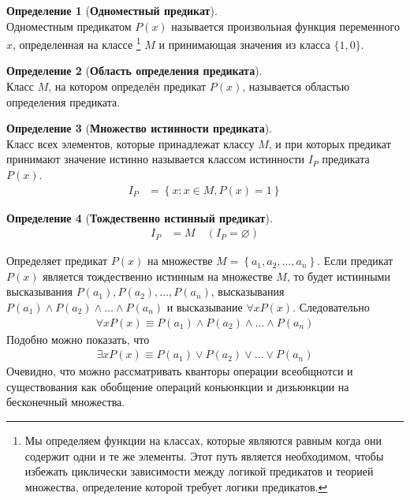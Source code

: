 \documentclass[fleqn,11pt]{article}
\theoremstyle{definition}
\newtheorem{definition}{Определение}
\begin{document}
\begin{definition}[\textbf{Одноместный предикат}] ~\\
	Одноместным предикатом $P(x)$ называется произвольная функция переменного $x$, определенная на классе
	\footnote{Мы определяем функции на классах, которые являются равным когда они содержит одни и те же элементы.
	Этот путь является необходимом, чтобы избежать циклически зависимости между логикой предикатов и теорией множества,
	определение которой требует логики предикатов.
	} $M$ и принимающая
	значения из класса $\{1,0\}$.
\end{definition}

\begin{definition}[\textbf{Область определения предиката}] ~\\
Класс $M$, на котором определён предикат $P(x)$, называется областью определения предиката.
\end{definition}

\begin{definition}[\textbf{Множество истинности предиката}] ~\\
	Класс всех элементов, которые принадлежат классу $M$, и при которых предикат принимают значение истинно называется
	классом истинности $I_P$ предиката $P(x)$.
	\begin{align}
		I_P &= \left\{x : x \in M, P(x) = 1 \right\}
	\end{align}
\end{definition}

\begin{definition}[\textbf{Тождественно истинный предикат}] ~\\
	\begin{align}
		I_P &= M \quad (I_P = \varnothing)
	\end{align}
\end{definition}

Определяет предикат $P(x)$ на множестве $M = \left\{a_1, a_2, \dots , a_n \right\}$. Если предикат $P(x)$
является тождественно истинным на множестве $M$, то будет истинными высказывания
$P(a_1), P(a_2), \dots, P(a_n)$,
высказывания $P(a_1) \land P(a_2) \land \dots \land P(a_n)$ и высказывание $\forall x P(x)$. Следовательно
\begin{align}
	\forall x P(x) \equiv P(a_1) \land P(a_2) \land \dots \land P(a_n)
\end{align}
Подобно можно показать, что
\begin{align}
	\exists x P(x) \equiv P(a_1) \lor P(a_2) \lor \dots \lor P(a_n)
\end{align}
Очевидно, что можно рассматривать кванторы операции всеобщнотси и существования как
обобщение операций коньюнкции и дизьюнкции на бесконечный множества.
\end{document}
